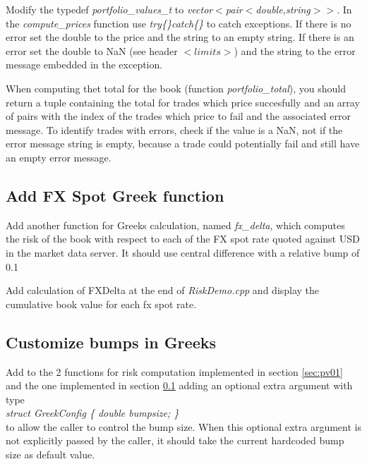 \documentclass[10pt]{article}
\begin{document}
Modify the typedef \textit{portfolio\_values\_t} to \textit{vector$<$pair$<$double,string$>>$}. In the \textit{compute\_prices} function use \textit{try\{\}catch\{\}} to catch exceptions. If there is no error set the double to the price and the string to an empty string. If there is an error set the double to NaN (see header $<limits>$) and the string to the error message embedded in the exception.

When computing thet total for the book (function \textit{portfolio\_total}), you should return a tuple containing the total for trades which price succesfully and an array of pairs with the index of the trades which price to fail and the associated error message. To identify trades with errors, check if the value is a NaN, not if the error message string is empty, because a trade could potentially fail and still have an empty error message.

\subsection{Add FX Spot Greek function}
\label{sec:fxdelta}
Add another function for Greeks calculation, named \textit{fx\_delta}, which computes the risk of the book with respect to each of the FX spot rate quoted against USD in the market data server. It should use central difference with a relative bump of 0.1%

Add calculation of FXDelta at the end of \textit{RiskDemo.cpp} and display the cumulative book value for each fx spot rate.

\subsection{Customize bumps in Greeks}

Add to the 2 functions for risk computation implemented in section \ref{sec:pv01} and the one implemented in section \ref{sec:fxdelta} adding an optional extra argument with type\\
\textit{struct GreekConfig \{ double bumpsize; \}}\\
to allow the caller to control the bump size. When this optional extra argument is not explicitly passed by the caller, it should take the current hardcoded bump size as default value.
\end{document}
